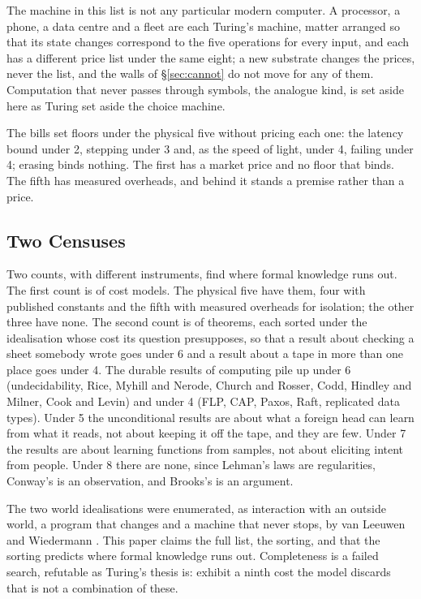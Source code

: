 \documentclass[11pt,oneside]{article}
\theoremstyle{definition}
\theoremstyle{remark}
\begin{document}
The machine in this list is not any particular modern computer. A processor, a phone, a
data centre and a fleet are each Turing's machine, matter arranged so that its state
changes correspond to the five operations for every input, and each has a different price
list under the same eight; a new substrate changes the prices, never the list, and the
walls of \S\ref{sec:cannot} do not move for any of them. Computation that never passes
through symbols, the analogue kind, is set aside here as Turing set aside the choice
machine.

The bills set floors under the physical five without pricing each one: the latency bound
under 2, stepping under 3 and, as the speed of light, under 4, failing under 4; erasing
binds nothing. The first has a market price and no floor that binds. The fifth has
measured overheads, and behind it stands a premise rather than a price.

\subsection{Two Censuses}

Two counts, with different instruments, find where formal knowledge runs out. The first
count is of cost models. The physical five have them, four with published constants and
the fifth with measured overheads for isolation; the other three have none. The second
count is of theorems, each sorted under the idealisation whose cost its question
presupposes, so that a result about checking a sheet somebody wrote goes under 6 and a
result about a tape in more than one place goes under 4. The durable results of computing
pile up under 6 (undecidability, Rice, Myhill and Nerode, Church and Rosser, Codd, Hindley
and Milner, Cook and Levin) and under 4 (FLP, CAP, Paxos, Raft, replicated data types).
Under 5 the unconditional results are about what a foreign head can learn from what it
reads, not about keeping it off the tape, and they are few. Under 7 the results are about
learning functions from samples, not about eliciting intent from people. Under 8 there are
none, since Lehman's laws are regularities, Conway's is an observation, and Brooks's is an
argument.

The two world idealisations were enumerated, as interaction with an outside world, a
program that changes and a machine that never stops, by van Leeuwen and Wiedermann
\cite{vanleeuwen2001}. This paper claims the full list, the sorting, and that the sorting
predicts where formal knowledge runs out. Completeness is a failed search, refutable as
Turing's thesis is: exhibit a ninth cost the model discards that is not a combination of
these.
\end{document}
